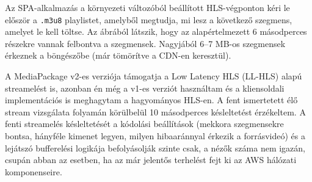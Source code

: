 Az SPA-alkalmazás a környezeti változóból beállított HLS-végponton kéri le először a \verb|.m3u8| playlistet, amelyből megtudja, mi lesz a következő szegmens, amelyet le kell töltse. Az ábrából látszik, hogy az alapértelmezett 6 másodperces részekre vannak felbontva a szegmensek. Nagyjából 6--7 MB-os szegmensek érkeznek a böngészőbe (már tömörítve a CDN-en keresztül).

A MediaPackage v2-es verziója támogatja a Low Latency HLS (LL-HLS) alapú streamelést is, azonban én még a v1-es verziót használtam és a kliensoldali implementációs is meghagytam a hagyományos HLS-en. A fent ismertetett élő stream vizsgálata folyamán körülbelül 10 másodperces késleltetést érzékeltem. A fenti streamelés késleltetését a kódolási beállítások (mekkora szegmensekre bontsa, hányféle kimenet legyen, milyen hibaaránnyal érkezik a forrásvideó) és a lejátszó bufferelési logikája befolyásolják szinte csak, a nézők száma nem igazán, csupán abban az esetben, ha az már jelentős terhelést fejt ki az AWS hálózati komponenseire. \cite{latency}
